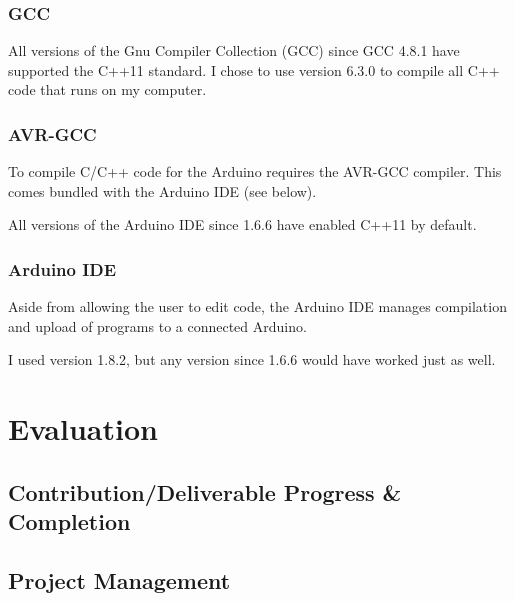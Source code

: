 \documentclass[a4paper]{article}
\begin{document}
\subsubsection{GCC}

All versions of the Gnu Compiler Collection (GCC) since GCC 4.8.1 have supported the C++11 standard\cite{ppref16}. I chose to use version 6.3.0\cite{ppref17} to compile all C++ code that runs on my computer.

\subsubsection{AVR-GCC}

To compile C/C++ code for the Arduino requires the AVR-GCC compiler. This comes bundled with the Arduino IDE\cite{ppref8} (see below).

All versions of the Arduino IDE since 1.6.6 have enabled C++11 by default.

\subsubsection{Arduino IDE}

Aside from allowing the user to edit code, the Arduino IDE\cite{ppref18} manages compilation and upload of programs to a connected Arduino.

I used version 1.8.2, but any version since 1.6.6 would have worked just as well.

\newpage
\section{Evaluation}

\subsection{Contribution/Deliverable Progress \& Completion}%


\subsection{Project Management}%

\end{document}

